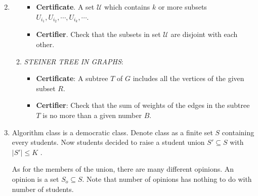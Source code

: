 \documentclass[12pt,a4paper]{article}
\makeatletter
\newtheorem*{solution}{Solution}
\theoremstyle{definition}
\renewenvironment{solution}[1][Solution] {\par\pushQED{\qed}\normalfont\topsep6\p@\@plus6\p@\relax\trivlist\item[\hskip\labelsep\bfseries#1\@addpunct{.}]\ignorespaces}{\popQED\endtrivlist\@endpefalse} \makeatother
\makeatother
\begin{document}
\begin{enumerate}
\begin{solution}
\begin{enumerate}
            \begin{itemize}
            \item \textbf{Certificate}. A set $\mathcal{U}$ which contains $k$ or more subsets $U_{i_1}, U_{i_2}, \cdots, U_{i_k}, \cdots$. 
            \item \textbf{Certifier}. Check that the subsets in set $\mathcal{U}$ are disjoint with each other.
            \end{itemize}
		\item \emph{STEINER TREE IN GRAPHS}:
            \begin{itemize}
            \item \textbf{Certificate}: A subtree $T$ of $G$ includes all the vertices of the given subset $R$.
            \item \textbf{Certifier}: Check that the sum of weights of the edges in the subtree $T$ is no more than a given number $B$.
            \end{itemize}
        \end{enumerate}
    \end{solution}
    \clearpage

	\item Algorithm class is a democratic class. Denote class as a finite set $S$ containing every students. Now students decided to raise a student union $S' \subseteq S$ with $|S'|\leq K$ .
	
	As for the members of the union, there are many different opinions. An opinion is a set $S_o\subseteq S$. Note that number of opinions has nothing to do with number of students.
	

\end{enumerate}
\end{document}
